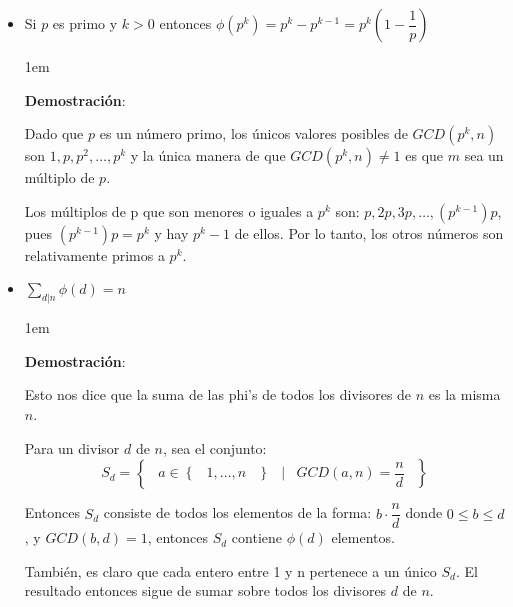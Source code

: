 \documentclass[12pt, fleqn]{report}                             %
\newenvironment{SmallIndentation}[1][0.75em]                    %
    {\begin{adjustwidth}{#1}{}\begin{footnotesize}}                 %
    {\end{footnotesize}\end{adjustwidth}}                           %
\DeclareMathOperator \Space {\quad}                             %
\DeclareMathOperator \MiniSpace {\;}                            %
\newcommand \Such {\MiniSpace|\MiniSpace}                       %
\newcommand{\Set}[1]{\left\{ \MiniSpace #1 \MiniSpace \right\}} %
\newcommand{\Wrap}[1]{\left( #1 \right)}                        %
\begin{document}
\begin{itemize}
                \item Si $p$ es primo y $k > 0$ entonces
                    $\phi(p^k) = p^k - p^{k-1} = p^k\Wrap{1 - \dfrac{1}{p}}$

                    \begin{SmallIndentation}[1em]
                        \textbf{Demostración}:

                        Dado que $p$ es un número primo, los únicos valores posibles de
                        $GCD(p^k, n)$ son $1, p, p^2, \dots, p^k$ y la única manera de que
                        $GCD(p^k, n) \neq 1$ es que $m$ sea un múltiplo de $p$.

                        Los múltiplos de p que son menores o iguales a $p^k$ son:
                        $p, 2p, 3p, \dots , (p^{k-1})p$, pues $(p^{k-1})p = p^k$
                        y hay $p^k -1$ de ellos.
                        Por lo tanto, los otros números son relativamente primos a $p^k$.

                    \end{SmallIndentation}


                \item $\sum\limits_{d | n} \phi(d) = n$
                    \begin{SmallIndentation}[1em]
                        \textbf{Demostración}:

                        Esto nos dice que la suma de las phi's de todos los divisores
                        de $n$ es la misma $n$.

                        Para un divisor $d$ de $n$, sea el conjunto:
                        \begin{equation*}
                            S_d = \Set{ a \in \Set{1, \dots, n} \Such GCD(a, n) = \dfrac{n}{d}}  
                        \end{equation*}

                        Entonces $S_d$ consiste de todos los elementos de la forma:
                        $b \cdot \dfrac{n}{d}$ donde $0 \leq b \leq d$, y $GCD(b,d) = 1$,
                        entonces $S_d$ contiene $\phi(d)$ elementos.

                        También, es claro que cada entero entre 1 y n pertenece a un único 
                        $S_d$. El resultado entonces sigue de sumar sobre todos los divisores
                        $d$ de $n$.


\end{SmallIndentation}
\end{itemize}
\end{document}
